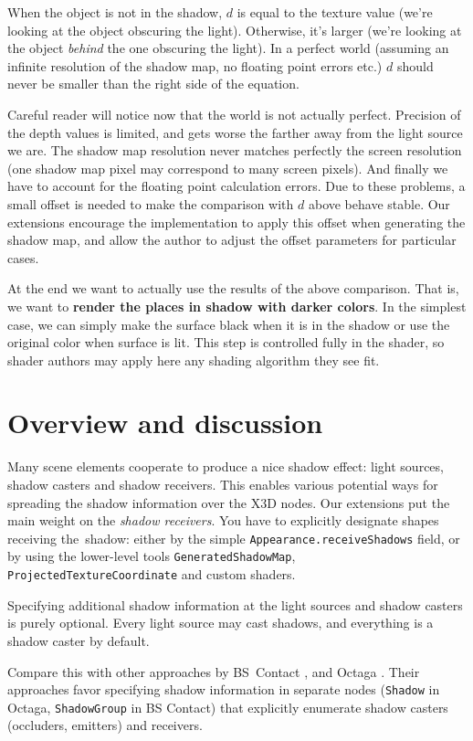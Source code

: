 \documentclass{acmsiggraph}                     %
\begin{document}
When the object is not in the shadow, $d$ is equal to the texture value
(we're looking at the object obscuring the light).
Otherwise, it's larger (we're looking at the object \emph{behind} the one obscuring the light).
In a perfect world (assuming an infinite resolution of the shadow map,
no floating point errors etc.) $d$ should never be smaller than the right side
of the equation.

Careful reader will notice now that the world is not actually perfect.
Precision of the depth values is limited,
and gets worse the farther away from the light source we are.
The shadow map resolution never matches perfectly the
screen resolution (one shadow map pixel may correspond to many screen pixels).
And finally we have to account for the floating point calculation errors.
Due to these problems, a small offset
is needed to make the comparison with $d$ above behave stable.
Our extensions encourage the implementation to apply this offset when generating
the shadow map, and allow the author to adjust the offset parameters
for particular cases.

At the end we want to actually use the results of the above comparison.
That is, we want to \textbf{render the places in shadow with darker colors}.
In the simplest case, we can simply make the surface black when
it is in the shadow or use the original color when surface is lit.
This step is controlled fully in the shader, so shader authors may
apply here any shading algorithm they see fit.

\section{Overview and discussion}

Many scene elements cooperate to produce a nice shadow effect: light
sources, shadow casters and shadow receivers. This enables various
potential ways for spreading the shadow information over the X3D
nodes. Our extensions put the main weight on the \emph{shadow
receivers}. You have to explicitly designate shapes receiving
the~shadow: either by the simple \texttt{Appearance.receiveShadows} field,
or by using the lower-level tools \texttt{GeneratedShadowMap},
\texttt{ProjectedTextureCoordinate} and custom shaders.

Specifying additional shadow information at the light sources and
shadow casters is purely optional. Every light source may cast
shadows, and everything is a shadow caster by default.

Compare this with other approaches by BS~Contact
\cite{bs:72}, \cite{bs:62} and Octaga \cite{octaga:shadow}. Their approaches
favor specifying shadow information in separate nodes (\texttt{Shadow}
in Octaga, \texttt{ShadowGroup} in BS Contact) that explicitly
enumerate shadow casters (occluders, emitters) and receivers.
\end{document}
